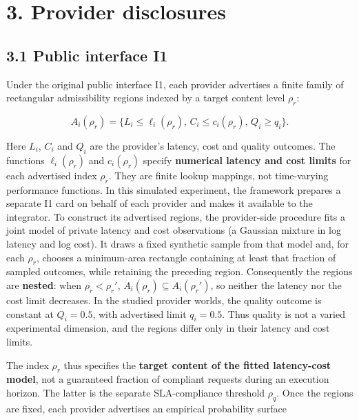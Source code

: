 \documentclass[10pt,a4paper]{article}
\begin{document}
\section*{3. Provider disclosures}

\subsection*{3.1 Public interface I1}
\label{sec:public-interface-i1}

Under the original public interface I1, each provider advertises a finite family of rectangular admissibility regions indexed by a target content level $\rho_r$:

\begin{equation*}
A_i(\rho_r)=
\{L_i\le\ell_i(\rho_r),\, C_i\le c_i(\rho_r),\, Q_i\ge q_i\}.
\tag{5}
\end{equation*}

Here $L_i$, $C_i$ and $Q_i$ are the provider's latency, cost and quality outcomes. The functions $\ell_i(\rho_r)$ and $c_i(\rho_r)$ specify \textbf{numerical latency and cost limits} for each advertised index $\rho_r$. They are finite lookup mappings, not time-varying performance functions. In this simulated experiment, the framework prepares a separate I1 card on behalf of each provider and makes it available to the integrator. To construct its advertised regions, the provider-side procedure fits a joint model of private latency and cost observations (a Gaussian mixture in log latency and log cost). It draws a fixed synthetic sample from that model and, for each $\rho_r$, chooses a minimum-area rectangle containing at least that fraction of sampled outcomes, while retaining the preceding region. Consequently the regions are \textbf{nested}: when $\rho_r<\rho_r'$, $A_i(\rho_r)\subseteq A_i(\rho_r')$, so neither the latency nor the cost limit decreases. In the studied provider worlds, the quality outcome is constant at $Q_i=0.5$, with advertised limit $q_i=0.5$. Thus quality is not a varied experimental dimension, and the regions differ only in their latency and cost limits.

The index $\rho_r$ thus specifies the \textbf{target content of the fitted latency-cost model}, not a guaranteed fraction of compliant requests during an execution horizon. The latter is the separate SLA-compliance threshold $\rho_q$. Once the regions are fixed, each provider advertises an empirical probability surface
\end{document}
